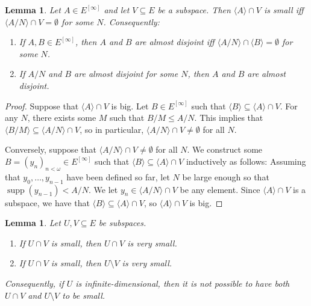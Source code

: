 \documentclass[11pt,reqno]{amsart}
\theoremstyle{plain}
\numberwithin{equation}{section}
\newtheorem{lemma}[theorem]{Lemma}
\theoremstyle{definition}
\newcommand{\func}{\operatorname}
\renewcommand{\c}[1]{\langle #1 \rangle}
\newcommand{\supp}{\func{supp}}
\begin{document}
\begin{lemma}
\label{lem:ad.iff.tail.disjoint}
    Let $A \in E^{[\infty]}$ and let $V \subseteq E$ be a subspace. Then $\c{A} \cap V$ is small iff $\c{A/N} \cap V = \emptyset$ for some $N$. Consequently:
    \begin{enumerate}
        \item If $A,B \in E^{[\infty]}$, then $A$ and $B$ are almost disjoint iff $\c{A/N} \cap \c{B} = \emptyset$ for some $N$.

        \item If $A/N$ and $B$ are almost disjoint for some $N$, then $A$ and $B$ are almost disjoint.
    \end{enumerate}
\end{lemma}

\begin{proof}
    Suppose that $\c{A} \cap V$ is big. Let $B \in E^{[\infty]}$ such that $\c{B} \subseteq \c{A} \cap V$. For any $N$, there exists some $M$ such that $B/M \leq A/N$. This implies that $\c{B/M} \subseteq \c{A/N} \cap V$, so in particular, $\c{A/N} \cap V \neq \emptyset$ for all $N$.

    Conversely, suppose that $\c{A/N} \cap V \neq \emptyset$ for all $N$. We construct some $B = (y_n)_{n<\omega} \in E^{[\infty]}$ such that $\c{B} \subseteq \c{A} \cap V$ inductively as follows: Assuming that $y_0,\dots,y_{n-1}$ have been defined so far, let $N$ be large enough so that $\supp(y_{n-1}) < A/N$. We let $y_n \in \c{A/N} \cap V$ be any element. Since $\c{A} \cap V$ is a subspace, we have that $\c{B} \subseteq \c{A} \cap V$, so $\c{A} \cap V$ is big.
\end{proof}

\begin{lemma}
\label{lem:ad.is.very.small}
    Let $U,V \subseteq E$ be subspaces.
    \begin{enumerate}
        \item If $U \cap V$ is small, then $U \cap V$ is very small.

        \item If $U \cap V$ is small, then $U \setminus V$ is very small.
    \end{enumerate}
    Consequently, if $U$ is infinite-dimensional, then it is not possible to have both $U \cap V$ and $U \setminus V$ to be small.
\end{lemma}
\end{document}
